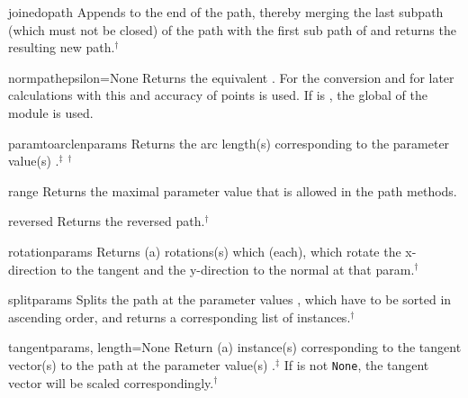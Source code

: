 \begin{methoddesc}{joined}{opath}
  Appends  to the end of the path, thereby merging the last
  subpath (which must not be closed) of the path with the first sub
  path of  and returns the resulting new path.$^\dagger$
\end{methoddesc}

\begin{methoddesc}{normpath}{epsilon=None}
  Returns the equivalent . For the conversion and for later
  calculations with this  and accuracy of
   points is used. If  is , the
  global  of the  module is used. 
\end{methoddesc}

\begin{methoddesc}{paramtoarclen}{params}
  Returns the arc length(s) corresponding to the parameter value(s)
  .$^\ddagger$ $^\dagger$
\end{methoddesc}


\begin{methoddesc}{range}{}
  Returns the maximal parameter value  that is allowed in the
  path methods. 
\end{methoddesc}

\begin{methoddesc}{reversed}{}
  Returns the reversed path.$^\dagger$
\end{methoddesc}

\begin{methoddesc}{rotation}{params}
  Returns (a) rotations(s) which (each), which rotate the x-direction
  to the tangent and the y-direction to the normal at that param.$^\dagger$
\end{methoddesc}

\begin{methoddesc}{split}{params}
  Splits the path at the parameter values , which have to
  be sorted in ascending order, and returns a corresponding list of
   instances.$^\dagger$
\end{methoddesc}

\begin{methoddesc}{tangent}{params, length=None}
  Return (a)  instance(s) corresponding to the tangent
  vector(s) to the path at the parameter value(s)
  .$^\ddagger$ If  is not \texttt{None}, the
  tangent vector will be scaled correspondingly.$^\dagger$
\end{methoddesc}

